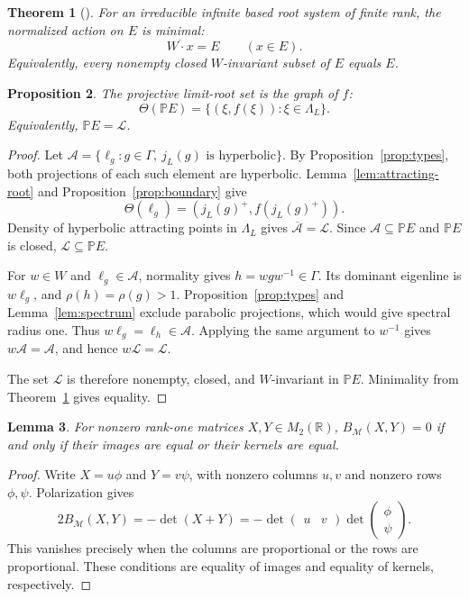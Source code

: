 \documentclass[11pt,reqno]{amsart}
\newcommand{\R}{\mathbb{R}}
\theoremstyle{plain}
\newtheorem{theorem}{Theorem}[section]
\newtheorem{lemma}[theorem]{Lemma}
\newtheorem{proposition}[theorem]{Proposition}
\theoremstyle{definition}
\theoremstyle{remark}
\numberwithin{equation}{section}
\begin{document}
\begin{theorem}[{\cite[Theorem~3.1(b)]{DHR}}]\label{thm:minimality}
For an irreducible infinite based root system of finite rank, the normalized action on $E$ is minimal:
\[
\overline{W\cdot x}=E\qquad(x\in E).
\]
Equivalently, every nonempty closed $W$-invariant subset of $E$ equals $E$.
\end{theorem}

\begin{proposition}\label{prop:graph}
The projective limit-root set is the graph of $f$:
\[
\Theta(\mathbb P E)=\{(\xi,f(\xi)):\xi\in\Lambda_L\}.
\]
Equivalently, $\mathbb P E=\mathcal L$.
\end{proposition}
\begin{proof}
Let $\mathcal A=\{\ell_g:g\in\Gamma,\ j_L(g)\text{ is hyperbolic}\}$. By Proposition~\ref{prop:types}, both projections of each such element are hyperbolic. Lemma~\ref{lem:attracting-root} and Proposition~\ref{prop:boundary} give
\[
\Theta(\ell_g)=(j_L(g)^+,f(j_L(g)^+)).
\]
Density of hyperbolic attracting points in $\Lambda_L$ gives $\overline{\mathcal A}=\mathcal L$. Since $\mathcal A\subseteq\mathbb P E$ and $\mathbb P E$ is closed, $\mathcal L\subseteq\mathbb P E$.

For $w\in W$ and $\ell_g\in\mathcal A$, normality gives $h=wgw^{-1}\in\Gamma$. Its dominant eigenline is $w\ell_g$, and $\rho(h)=\rho(g)>1$. Proposition~\ref{prop:types} and Lemma~\ref{lem:spectrum} exclude parabolic projections, which would give spectral radius one. Thus $w\ell_g=\ell_h\in\mathcal A$. Applying the same argument to $w^{-1}$ gives $w\mathcal A=\mathcal A$, and hence $w\mathcal L=\mathcal L$.

The set $\mathcal L$ is therefore nonempty, closed, and $W$-invariant in $\mathbb P E$. Minimality from Theorem~\ref{thm:minimality} gives equality.
\end{proof}

\begin{lemma}\label{lem:orth-rank-one}
For nonzero rank-one matrices $X,Y\in M_2(\R)$, $B_{\mathcal M}(X,Y)=0$ if and only if their images are equal or their kernels are equal.
\end{lemma}
\begin{proof}
Write $X=u\phi$ and $Y=v\psi$, with nonzero columns $u,v$ and nonzero rows $\phi,\psi$. Polarization gives
\[
2B_{\mathcal M}(X,Y)=-\det(X+Y)
=-\det\begin{pmatrix}u&v\end{pmatrix}\det\begin{pmatrix}\phi\\\psi\end{pmatrix}.
\]
This vanishes precisely when the columns are proportional or the rows are proportional. These conditions are equality of images and equality of kernels, respectively.
\end{proof}
\end{document}
